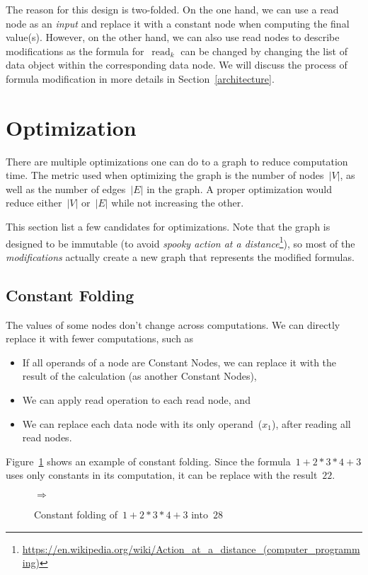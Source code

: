 \documentclass{article}
\DeclareMathOperator{\readNode}{read}
\begin{document}
The reason for this design is two-folded.
On the one hand, we can use a read node as an \emph{input} and replace it with a constant node when computing the final value(s).
However, on the other hand, we can also use read nodes to describe modifications as the formula for~$\readNode_k$ can be changed by changing the list of data object within the corresponding data node.
We will discuss the process of formula modification in more details in Section~\ref{architecture}.

\section{Optimization}

There are multiple optimizations one can do to a graph to reduce computation time.
The metric used when optimizing the graph is the number of nodes~$|V|$, as well as the number of edges~$|E|$ in the graph.
A proper optimization would reduce either~$|V|$ or~$|E|$ while not increasing the other.

This section list a few candidates for optimizations.
Note that the graph is designed to be immutable (to avoid \emph{spooky action at a distance}\footnote{
	\url{https://en.wikipedia.org/wiki/Action_at_a_distance_(computer_programming)}
}), so most of the \emph{modifications} actually create a new graph that represents the modified formulas.

\subsection{Constant Folding}

The values of some nodes don't change across computations. We can directly replace it with fewer computations, such as
%
\begin{itemize}
	\item If all operands of a node are Constant Nodes, we can replace it with the result of the calculation (as another Constant Nodes),
	\item We can apply read operation to each read node, and
	\item We can replace each data node with its only operand~($x_1$), after reading all read nodes.
\end{itemize}
%
Figure~\ref{fig:optimization:folding-example} shows an example of constant folding.
Since the formula~$1 + 2 * 3 * 4 + 3$ uses only constants in its computation, it can be replace with the result~$22$.
%
\begin{figure}
	\centering
	\quad$\Rightarrow$\quad
	\caption{Constant folding of~$1 + 2 * 3 * 4 + 3$  into~$28$}
	\label{fig:optimization:folding-example}
\end{figure}
\end{document}
